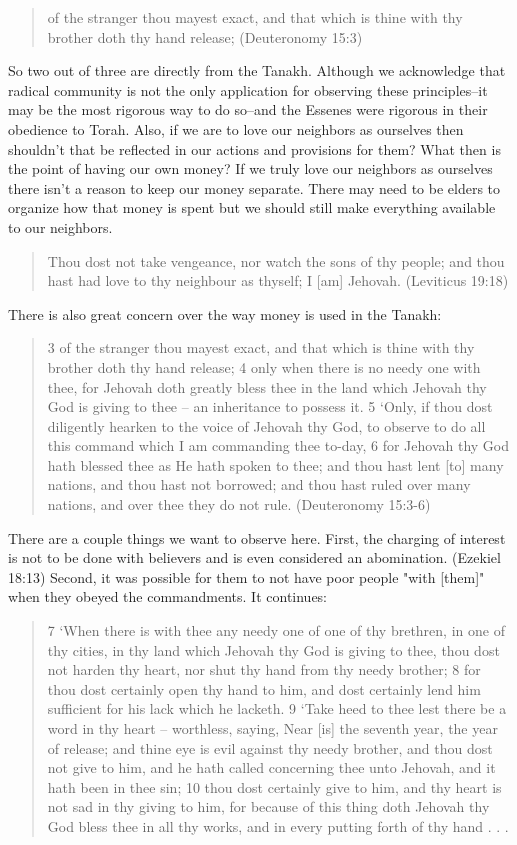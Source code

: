 \documentclass[11pt]{article}
\begin{document}
\begin{quote}
of the stranger thou mayest exact, and that which is thine with thy brother doth thy hand release;
(Deuteronomy 15:3)
\end{quote}
So two out of three are directly from the Tanakh. Although we acknowledge that radical community is not the only application for observing these principles--it may be the most rigorous way to do so--and the Essenes were rigorous in their obedience to Torah. Also, if we are to love our neighbors as ourselves then shouldn't that be reflected in our actions and provisions for them? What then is the point of having our own money? If we truly love our neighbors as ourselves there isn't a reason to keep our money separate. There may need to be elders to organize how that money is spent but we should still make everything available to our neighbors. 
\begin{quote}
Thou dost not take vengeance, nor watch the sons of thy people; and thou hast had love to thy neighbour as thyself; I [am] Jehovah.
(Leviticus 19:18)
\end{quote}
There is also great concern over the way money is used in the Tanakh:
\begin{quote}
3 of the stranger thou mayest exact, and that which is thine with thy brother doth thy hand release;
4 only when there is no needy one with thee, for Jehovah doth greatly bless thee in the land which Jehovah thy God is giving to thee -- an inheritance to possess it.
5 `Only, if thou dost diligently hearken to the voice of Jehovah thy God, to observe to do all this command which I am commanding thee to-day,
6 for Jehovah thy God hath blessed thee as He hath spoken to thee; and thou hast lent [to] many nations, and thou hast not borrowed; and thou hast ruled over many nations, and over thee they do not rule. (Deuteronomy 15:3-6)
\end{quote}
There are a couple things we want to observe here. First, the charging of interest is not to be done with believers and is even considered an abomination. (Ezekiel 18:13) Second, it was possible for them to not have poor people "with [them]" when they obeyed the commandments. It continues:
\begin{quote}
7 `When there is with thee any needy one of one of thy brethren, in one of thy cities, in thy land which Jehovah thy God is giving to thee, thou dost not harden thy heart, nor shut thy hand from thy needy brother;
8 for thou dost certainly open thy hand to him, and dost certainly lend him sufficient for his lack which he lacketh.
9 `Take heed to thee lest there be a word in thy heart -- worthless, saying, Near [is] the seventh year, the year of release; and thine eye is evil against thy needy brother, and thou dost not give to him, and he hath called concerning thee unto Jehovah, and it hath been in thee sin;
10 thou dost certainly give to him, and thy heart is not sad in thy giving to him, for because of this thing doth Jehovah thy God bless thee in all thy works, and in every putting forth of thy hand . . . 
\end{quote}
\end{document}
